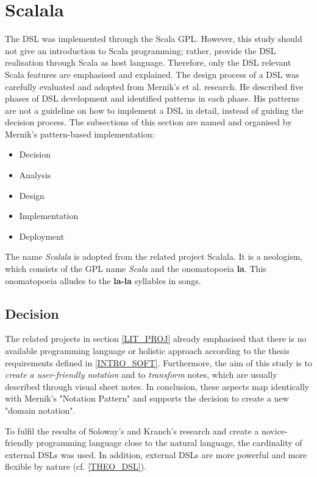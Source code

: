 \section{Scalala}
\label{IMPL_SCALALA}
The DSL was implemented through the Scala GPL. However, this study should not give an introduction to Scala programming; rather, provide the DSL realisation through Scala as host language. Therefore, only the DSL relevant Scala features are emphasised and explained. The design process of a DSL was carefully evaluated and adopted from Mernik's et al. research.\cite{Mernik2005} He described five phases of DSL development and identified patterns in each phase. His patterns are not a guideline on how to implement a DSL in detail, instead of guiding the decision process. The subsections of this section are named and organised by Mernik's pattern-based implementation:

\begin{itemize}
\item Decision
\item Analysis
\item Design
\item Implementation
\item Deployment
\end{itemize}

The name \textit{Scalala} is adopted from the related project Scalala. It is a neologism, which consists of the GPL name \textit{Scala} and the onomatopoeia \textbf{la}. This onomatopoeia alludes to the \textbf{la-la} syllables in songs.

\subsection{Decision}
\label{IMPL_SCALALA_DECISION}
The related projects in section \ref{LIT_PROJ} already emphasised that there is no available programming language or holistic approach according to the thesis requirements defined in \ref{INTRO_SOFT}. Furthermore, the aim of this study is to \textit{create a user-friendly notation} and to \textit{transform} notes, which are usually described through visual sheet notes. In conclusion, these aspects map identically with Mernik's "Notation Pattern" and supports the decision to create a new "domain notation".\cite{Mernik2005}

To fulfil the results of Soloway's\cite{Soloway1982}  and Kranch's\cite{Kranch2012} research and create a novice-friendly programming language close to the natural language, the cardinality of external DSLs was used. In addition, external DSLs are more powerful and more flexible by nature (cf. \ref{THEO_DSL}).

